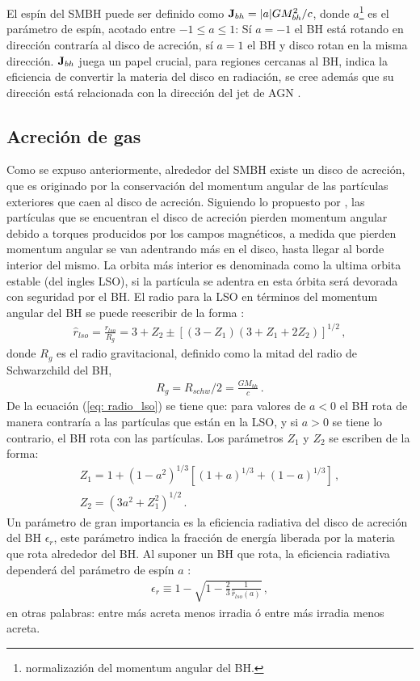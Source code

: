 El espín del SMBH puede ser definido como ${\bf{J}}_{bh}=|a|GM^{2}_{bh}/c$, donde $a$\footnote{normalizazión del momentum angular del BH.} es el parámetro de espín, acotado entre $-1\leq a \leq 1$: Sí $a=-1$ el BH está rotando en dirección contraría al disco de acreción, sí $a=1$ el BH y disco rotan en la misma dirección. ${\bf{J}}_{bh}$ juega un papel crucial, para regiones cercanas al BH, indica la eficiencia de convertir la materia del disco en radiación, se cree además que su dirección está relacionada con la dirección del jet de AGN \cite{fanidakis2011}. 

\subsection{Acreción de gas}
\label{subsec: Acrecion_gas}
Como se expuso anteriormente, alrededor del SMBH existe un disco de acreción, que es originado por la conservación del momentum angular de las partículas exteriores que caen al disco de acreción. Siguiendo lo propuesto por \cite{lynden1969}, las partículas que se encuentran el disco de acreción pierden momentum angular debido a torques producidos por los campos magnéticos, a medida que pierden momentum angular se van adentrando más en el disco, hasta llegar al borde interior del mismo. La orbita más interior es denominada como la ultima orbita estable (del ingles LSO), si la partícula se adentra en esta órbita será devorada con seguridad por el BH. El radio para la LSO en términos del momentum angular del BH se puede reescribir de la forma \cite{bardeen1972}:
%
\begin{align}
 \hat{r}_{lso}=\frac{r_{lso}}{R_g}=3+Z_{2}\pm \left[ (3-Z_{1})(3+Z_{1}+2Z_{2})\right]^{1/2} \,,
 \label{eq: radio_lso}
\end{align}
%
donde $R_{g}$ es el radio gravitacional, definido como la mitad del radio de Schwarzchild del BH, 
%
\begin{align}
    R_{g}= R_{schw}/2  = \frac{GM_{bh}}{c}\,.
\end{align}
%
De la ecuación (\ref{eq: radio_lso}) se tiene que: para valores de $a<0$ el BH rota de manera contraría a las partículas que están en la LSO, y si $a>0$ se tiene lo contrario, el BH rota con las partículas. Los parámetros $Z_1$ y $Z_2$ se escriben de la forma:
%
\begin{eqnarray}
    Z_1 = 1+(1-a^{2})^{1/3}\left[(1+a)^{1/3}+(1-a)^{1/3} \right]\,,\\
    Z_2 = (3a^{2}+Z_{1}^{2})^{1/2}\,.
\end{eqnarray}
%
Un parámetro de gran importancia es la eficiencia radiativa del disco de acreción del BH $\epsilon_{r}$, este parámetro indica la fracción de energía liberada por la materia que rota alrededor del BH. Al suponer un BH que rota, la eficiencia radiativa dependerá del parámetro de espín $a$ \cite{novikov1973}:
%
\begin{align}
    \epsilon_{r} \equiv 1- \sqrt{1-\frac{2}{3}\frac{1}{\hat{r}_{lso}(a)}}\,,
    \label{eq: eficiencia radiativa}
\end{align}
%
en otras palabras: entre más acreta menos irradia ó entre más irradia menos acreta.

